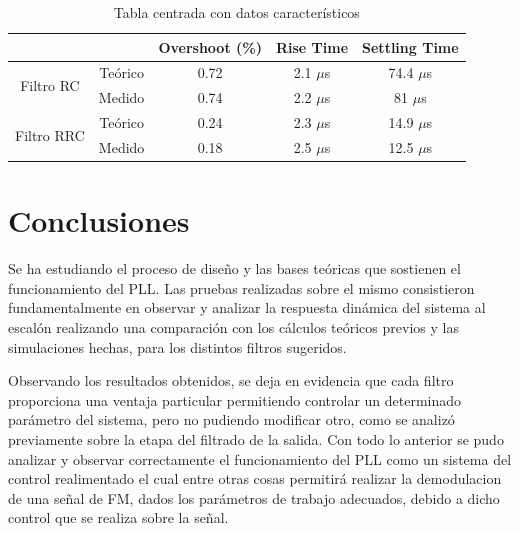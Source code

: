 \documentclass{article}
\begin{document}
\begin{table}[H]
	\centering
\begin{tabular}{|c|c|c|c|c|}
\hline
\multicolumn{2}{|c|}{}                & Overshoot (\%) & Rise Time & Settling Time \\ \hline
\multirow{2}{*}{Filtro RC}  & Teórico & 0.72           & 2.1 $\mu$s    & 74.4 $\mu$s       \\ \cline{2-5} 
                            & Medido  & 0.74           & 2.2 $\mu$s    & 81 $\mu$s         \\ \hline
\multirow{2}{*}{Filtro RRC} & Teórico & 0.24           & 2.3 $\mu$s    & 14.9 $\mu$s       \\ \cline{2-5} 
                            & Medido  & 0.18           & 2.5 $\mu$s    & 12.5 $\mu$s       \\ \hline
\end{tabular}
	\caption{Tabla centrada con datos característicos}
\end{table}

\newpage

\section*{Conclusiones}
Se ha estudiando el proceso de diseño y las bases teóricas que sostienen el funcionamiento del PLL. Las pruebas realizadas sobre el mismo consistieron fundamentalmente en observar y analizar la respuesta dinámica del sistema al escalón realizando una comparación con los cálculos teóricos previos y las simulaciones hechas, para los distintos filtros sugeridos.\par
Observando los resultados obtenidos, se deja en evidencia que cada filtro proporciona una ventaja particular permitiendo controlar un determinado parámetro del sistema, pero no pudiendo modificar otro, como se analizó previamente sobre la etapa del filtrado de la salida. Con todo lo anterior se pudo analizar y observar correctamente el funcionamiento del PLL como un sistema del control realimentado el cual entre otras cosas permitirá realizar la demodulacion de una señal de FM, dados los parámetros de trabajo adecuados, debido a dicho control que se realiza sobre la señal.
\end{document}

